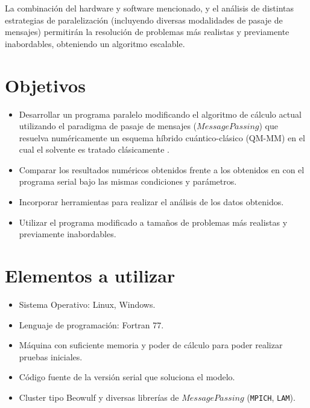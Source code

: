 \documentclass[a4paper, 12pt]{article}
\begin{document}
La combinaci\'on del hardware y software mencionado, y el an\'alisis de distintas estrategias de paralelizaci\'on (incluyendo diversas modalidades de pasaje de mensajes) permitir\'an la resoluci\'on de problemas m\'as realistas y previamente inabordables, obteniendo un algoritmo escalable.


\section*{Objetivos}

\begin{itemize}
\item Desarrollar un programa paralelo modificando el algoritmo de c\'alculo actual utilizando el paradigma de pasaje de mensajes ($Message Passing$) que resuelva num\'ericamente un esquema h\'ibrido cu\'antico-cl\'asico (QM-MM) en el cual el solvente es tratado cl\'asicamente \cite{Nemukhin2002, Kesavan2003, lebrero2002}.

\item Comparar los resultados num\'ericos obtenidos frente a los obtenidos en con el programa serial bajo las mismas condiciones y par\'ametros.

\item Incorporar herramientas para realizar el an\'alisis de los datos obtenidos.

\item Utilizar el programa modificado a tama\~nos de problemas m\'as realistas y previamente inabordables.

\end{itemize}

\section*{Elementos a utilizar}

\begin{itemize}
\item Sistema Operativo: Linux, Windows.

\item Lenguaje de programaci\'on: Fortran 77.

\item M\'aquina con suficiente memoria y poder de c\'alculo para poder realizar pruebas iniciales.

\item C\'odigo fuente de la versi\'on serial que soluciona el modelo.

\item Cluster tipo Beowulf y diversas librer\'ias de $Message Passing$ (\texttt{MPICH}\cite{MPICH}, \texttt{LAM}\cite{LAM_MPI}).

\end{itemize}
\end{document}
